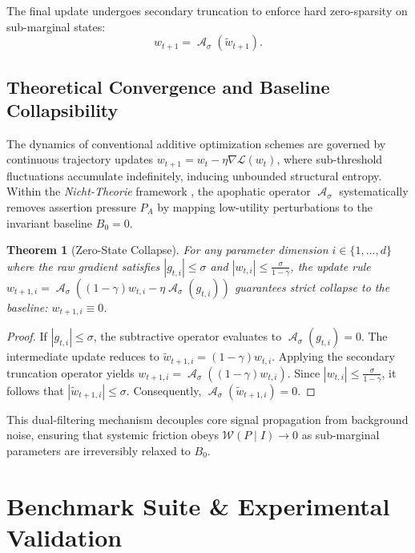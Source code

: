 \documentclass[11pt,a4paper]{article}
\newtheorem{theorem}{Theorem}
\DeclareMathOperator{\Apophatic}{\mathcal{A}}
\newcommand{\Wfriction}{\mathcal{W}}
\newcommand{\Ppress}{P_A}
\newcommand{\Baseline}{B_0}
\begin{document}
The final update undergoes secondary truncation to enforce hard zero-sparsity on sub-marginal states:
\begin{equation}
w_{t+1} = \Apophatic_\sigma(\tilde{w}_{t+1}).
\end{equation}

\subsection{Theoretical Convergence and Baseline Collapsibility}
The dynamics of conventional additive optimization schemes are governed by continuous trajectory updates $w_{t+1} = w_t - \eta \nabla \mathcal{L}(w_t)$, where sub-threshold fluctuations accumulate indefinitely, inducing unbounded structural entropy. Within the \textit{Nicht-Theorie} framework \cite{nicht_theory_monograph}, the apophatic operator $\Apophatic_\sigma$ systematically removes assertion pressure $\Ppress$ by mapping low-utility perturbations to the invariant baseline $\Baseline = 0$.

\begin{theorem}[Zero-State Collapse]
For any parameter dimension $i \in \{1, \dots, d\}$ where the raw gradient satisfies $|g_{t,i}| \le \sigma$ and $|w_{t,i}| \le \frac{\sigma}{1-\gamma}$, the update rule $w_{t+1, i} = \Apophatic_\sigma((1-\gamma)w_{t,i} - \eta \Apophatic_\sigma(g_{t,i}))$ guarantees strict collapse to the baseline: $w_{t+1, i} \equiv 0$.
\end{theorem}

\begin{proof}
If $|g_{t,i}| \le \sigma$, the subtractive operator evaluates to $\Apophatic_\sigma(g_{t,i}) = 0$. The intermediate update reduces to $\tilde{w}_{t+1, i} = (1 - \gamma) w_{t,i}$. Applying the secondary truncation operator yields $w_{t+1, i} = \Apophatic_\sigma((1-\gamma)w_{t,i})$. Since $|w_{t,i}| \le \frac{\sigma}{1-\gamma}$, it follows that $|\tilde{w}_{t+1, i}| \le \sigma$. Consequently, $\Apophatic_\sigma(\tilde{w}_{t+1, i}) = 0$.
\end{proof}

This dual-filtering mechanism decouples core signal propagation from background noise, ensuring that systemic friction obeys $\Wfriction(P \mid I) \to 0$ as sub-marginal parameters are irreversibly relaxed to $\Baseline$.

\section{Benchmark Suite \& Experimental Validation}
\end{document}
